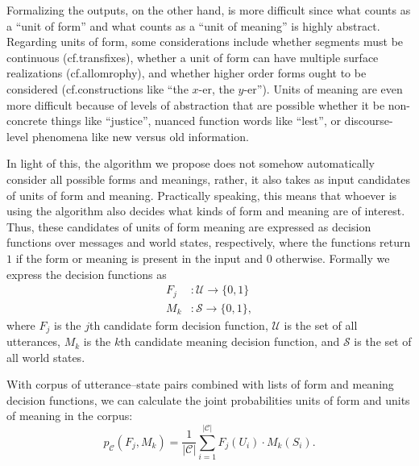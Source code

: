 Formalizing the outputs, on the other hand, is more difficult since what counts as a ``unit of form'' and what counts as a ``unit of meaning'' is highly abstract.
Regarding units of form, some considerations include whether segments must be continuous (cf.\@ transfixes), whether a unit of form can have multiple surface realizations (cf.\@ allomrophy), and whether higher order forms ought to be considered (cf.\@ constructions like ``the $x$-er, the $y$-er'').
Units of meaning are even more difficult because of levels of abstraction that are possible whether it be non-concrete things like ``justice'', nuanced function words like ``lest'', or discourse-level phenomena like new versus old information.

In light of this, the algorithm we propose does not somehow automatically consider all possible forms and meanings, rather, it also takes as input candidates of units of form and meaning.
Practically speaking, this means that whoever is using the algorithm also decides what kinds of form and meaning are of interest.
Thus, these candidates of units of form meaning are expressed as decision functions over messages and world states, respectively,
  where the functions return $1$ if the form or meaning is present in the input and $0$ otherwise.
Formally we express the decision functions as
\begin{align}
  F_j &: \mathcal U \rightarrow \{0,1\} \\
  M_k &: \mathcal S \rightarrow \{0,1\}
  ,
\end{align}
where
  $F_j$ is the $j$th candidate form decision function,
  $\mathcal U$ is the set of all utterances,
  $M_k$ is the $k$th candidate meaning decision function,
  and $\mathcal S$ is the set of all world states.

With corpus of utterance--state pairs combined with lists of form and meaning decision functions, we can calculate the joint probabilities units of form and units of meaning in the corpus:
\begin{equation} \label{eq:morph-joint}
  p_{\mathcal C}(F_j, M_k) = \frac1{|\mathcal C|} \sum^{|\mathcal C|}_{i=1} F_j(U_i) \cdot M_k(S_i)
  .
\end{equation}



